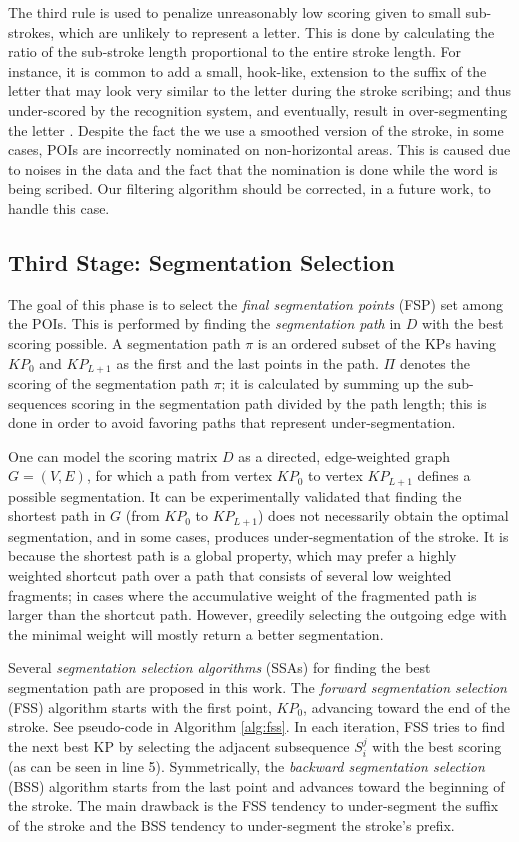 \documentclass[10pt, conference, compsocconf]{IEEEtran}
\begin{document}
The third rule is used to penalize unreasonably low scoring given to small sub-strokes, which are unlikely to represent a letter. 
This is done by calculating the ratio of the sub-stroke length proportional to the entire stroke length.
For instance, it is common to add a small, hook-like, extension to the suffix of the letter  that may look very similar to the letter  during the stroke scribing; and thus under-scored by the recognition system, and eventually, result in over-segmenting the letter . 
Despite the fact the we use a smoothed version of the stroke, in some cases, POIs are incorrectly nominated on non-horizontal areas. 
This is caused due to noises in the data and the fact that the nomination is done while the word is being scribed. 
Our filtering algorithm should be corrected, in a future work, to handle this case.

\subsection{Third Stage: Segmentation Selection}
The goal of this phase is to select the \emph{final segmentation points} (FSP) set among the POIs. 
This is performed by finding the \emph{segmentation path} in $D$ with the best scoring possible. 
A segmentation path $\pi$ is an ordered subset of the KPs having $KP_{0}$ and $KP_{L+1}$ as the first and the last points in the path.
$\Pi$ denotes the scoring of the segmentation path $\pi$; it is calculated by summing up the sub-sequences scoring in the segmentation path divided by the path length; this is done in order to avoid favoring paths that represent under-segmentation.

One can model the scoring matrix $D$ as a directed, edge-weighted graph $G=(V,E)$, for which a path from vertex $KP_0$ to vertex $KP_{L+1}$ defines a possible segmentation. 
It can be experimentally validated that finding the shortest path in $G$ (from $KP_0$ to $KP_{L+1}$) does not necessarily obtain the optimal segmentation, and in some cases, produces under-segmentation of the stroke. 
It is because the shortest path is a global property, which may prefer a highly weighted shortcut path over a path that consists of several low weighted fragments; in cases where the accumulative weight of the fragmented path is larger than the shortcut path.
However, greedily selecting the outgoing edge with the minimal weight will mostly return a better segmentation.

Several \emph{segmentation selection algorithms} (SSAs) for finding the best segmentation path are proposed in this work.
The \emph{forward segmentation selection} (FSS) algorithm starts with the first point, $KP_0$, advancing toward the end of the stroke. 
See pseudo-code in Algorithm \ref{alg:fss}.
In each iteration, FSS tries to find the next best KP by selecting the adjacent subsequence $S_i^j$ with the best scoring (as can be seen in line 5). 
Symmetrically, the \emph{backward segmentation selection} (BSS) algorithm starts from the last point and advances toward the beginning of the stroke.
The main drawback is the FSS tendency to under-segment the suffix of the stroke and the BSS tendency to under-segment the stroke's prefix.
\end{document}
